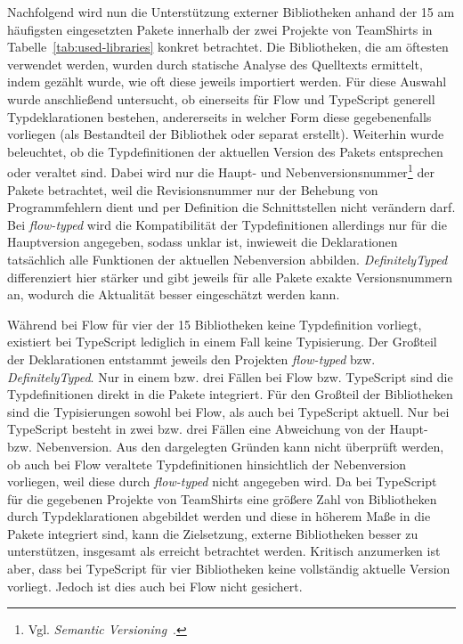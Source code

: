 Nachfolgend wird nun die Unterstützung externer Bibliotheken anhand der 15 am häufigsten eingesetzten Pakete innerhalb der zwei Projekte von TeamShirts in Tabelle~\ref{tab:used-libraries} konkret betrachtet. Die Bibliotheken, die am öftesten verwendet werden, wurden durch statische Analyse des Quelltexts ermittelt, indem gezählt wurde, wie oft diese jeweils importiert werden. Für diese Auswahl wurde anschließend untersucht, ob einerseits für Flow und TypeScript generell Typdeklarationen bestehen, andererseits in welcher Form diese gegebenenfalls vorliegen (als Bestandteil der Bibliothek oder separat erstellt). Weiterhin wurde beleuchtet, ob die Typdefinitionen der aktuellen Version des Pakets entsprechen oder veraltet sind. Dabei wird nur die Haupt- und Nebenversionsnummer\footnote{Vgl. \textit{Semantic Versioning}~\autocite{SEMANTIC_VERSIONING}.} der Pakete betrachtet, weil die Revisionsnummer nur der Behebung von Programmfehlern dient und per Definition die Schnittstellen nicht verändern darf. Bei \textit{flow-typed} wird die Kompatibilität der Typdefinitionen allerdings nur für die Hauptversion angegeben, sodass unklar ist, inwieweit die Deklarationen tatsächlich alle Funktionen der aktuellen Nebenversion abbilden. \textit{DefinitelyTyped} differenziert hier stärker und gibt jeweils für alle Pakete exakte Versionsnummern an, wodurch die Aktualität besser eingeschätzt werden kann.

\medbreak


Während bei Flow für vier der 15 Bibliotheken keine Typdefinition vorliegt, existiert bei TypeScript lediglich in einem Fall keine Typisierung. Der Großteil der Deklarationen entstammt jeweils den Projekten \textit{flow-typed} bzw. \textit{DefinitelyTyped}. Nur in einem bzw. drei Fällen bei Flow bzw. TypeScript sind die Typdefinitionen direkt in die Pakete integriert.
Für den Großteil der Bibliotheken sind die Typisierungen sowohl bei Flow, als auch bei TypeScript aktuell. Nur bei TypeScript besteht in zwei bzw. drei Fällen eine Abweichung von der Haupt- bzw. Nebenversion. Aus den dargelegten Gründen kann nicht überprüft werden, ob auch bei Flow veraltete Typdefinitionen hinsichtlich der Nebenversion vorliegen, weil diese durch \textit{flow-typed} nicht angegeben wird. Da bei TypeScript für die gegebenen Projekte von TeamShirts eine größere Zahl von Bibliotheken durch Typdeklarationen abgebildet werden und diese in höherem Maße in die Pakete integriert sind, kann die Zielsetzung, externe Bibliotheken besser zu unterstützen, insgesamt als erreicht betrachtet werden. Kritisch anzumerken ist aber, dass bei TypeScript für vier Bibliotheken keine vollständig aktuelle Version vorliegt. Jedoch ist dies auch bei Flow nicht gesichert.

